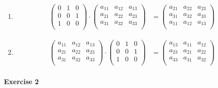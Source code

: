 \documentclass{article}
\begin{document}
\begin{enumerate}
    \item \begin{align*}
        \begin{pmatrix}
            0 & 1 & 0 \\
            0 & 0 & 1 \\
            1 & 0 & 0 \\
        \end{pmatrix} \cdot \begin{pmatrix}
            a_{11} & a_{12} & a_{13} \\
            a_{21} & a_{22} & a_{23} \\
            a_{31} & a_{32} & a_{33} \\
        \end{pmatrix} &= \begin{pmatrix}
            a_{21} & a_{22} & a_{23} \\
            a_{31} & a_{32} & a_{33} \\
            a_{11} & a_{12} & a_{13} \\
        \end{pmatrix}
    \end{align*}

    \item \begin{align*}
        \begin{pmatrix}
            a_{11} & a_{12} & a_{13} \\
            a_{21} & a_{22} & a_{23} \\
            a_{31} & a_{32} & a_{33} \\
        \end{pmatrix} \cdot \begin{pmatrix}
            0 & 1 & 0 \\
            0 & 0 & 1 \\
            1 & 0 & 0 \\
        \end{pmatrix} &= \begin{pmatrix}
            a_{13} & a_{11} & a_{12} \\
            a_{23} & a_{21} & a_{22} \\
            a_{33} & a_{31} & a_{32} \\
        \end{pmatrix}
    \end{align*}
\end{enumerate}

\paragraph{Exercise 2}
\end{document}
